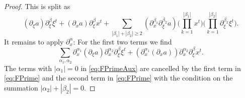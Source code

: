 \documentclass[10pt,a4paper]{amsart}
\begin{document}
\begin{proof}
This is split as
\begin{equation}
\label{eq:FPrimeExpAux}
    (\partial_{\xi} a) \partial_{\xi}^{\beta} \xi^t + (\partial_x a) \partial_{\xi}^{\beta} x^t + \sum_{|\beta_1|+|\beta_2| \geq 2} (\partial_{x}^{\beta_1} \partial_{\xi}^{\beta_2} a) \big( \prod_{k=1}^{|\beta_1|} x^t \big) \big( \prod_{k=1}^{|\beta_2|} \partial_{\xi}^{\beta_2} \xi^t \big).
\end{equation}
It remains to apply $\partial_x^{\alpha}$: For the first two terms we find
\begin{equation}
\label{eq:FPrimeAux}
    \sum_{\alpha_1,\alpha_2} \partial_x^{\alpha_1} (\partial_\xi a) \partial_x^{\alpha_2} \partial_{\xi}^{\beta} \xi^t + (\partial_x^{\alpha_1} (\partial_x a)) \partial_{x}^{\alpha_2} \partial_{\xi}^{\beta} x^t.
\end{equation}
The terms with $|\alpha_1| = 0$ in \eqref{eq:FPrimeAux} are cancelled by the first term in \eqref{eq:FPrime} and the second term in \eqref{eq:FPrime} with the condition on the summation $|\alpha_2| + |\beta_2| = 0$.


\end{proof}
\end{document}
